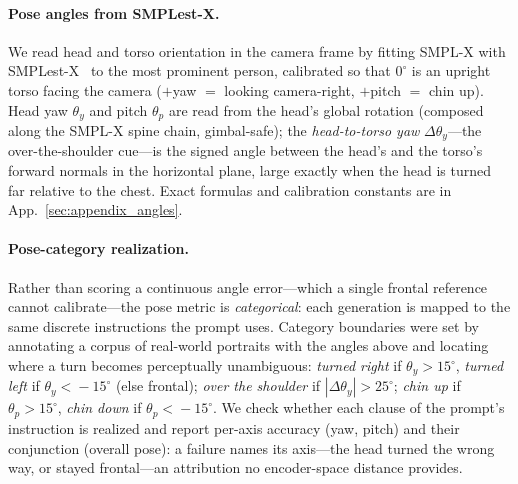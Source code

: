 \paragraph{Pose angles from SMPLest-X.}
We read head and torso orientation in the camera frame by fitting SMPL-X with
SMPLest-X~\cite{smplestx} to the most prominent person, calibrated so that
$0^\circ$ is an upright torso facing the camera ($+$yaw $=$ looking camera-right,
$+$pitch $=$ chin up). Head yaw $\theta_y$ and pitch $\theta_p$ are read from the
head's global rotation (composed along the SMPL-X spine chain, gimbal-safe);
the \emph{head-to-torso yaw} $\Delta\theta_y$---the over-the-shoulder cue---is
the signed angle between the head's and the torso's forward normals in the
horizontal plane, large exactly when the head is turned far relative to the
chest. Exact formulas and calibration constants are in
App.~\ref{sec:appendix_angles}.

\paragraph{Pose-category realization.} Rather than scoring a continuous angle
error---which a single frontal reference cannot calibrate---the pose metric is
\emph{categorical}: each generation is mapped to the same discrete
instructions the prompt uses. Category boundaries were set by annotating a
corpus of real-world portraits with the angles above and locating where a turn
becomes perceptually unambiguous: \emph{turned right} if
$\theta_y\!>\!15^\circ$, \emph{turned left} if $\theta_y\!<\!-15^\circ$ (else
frontal); \emph{over the shoulder} if $|\Delta\theta_y|\!>\!25^\circ$;
\emph{chin up} if $\theta_p\!>\!15^\circ$, \emph{chin down} if
$\theta_p\!<\!-15^\circ$. We check whether each clause of the prompt's
instruction is realized and report per-axis accuracy (yaw, pitch) and their
conjunction (overall pose): a failure names its axis---the head turned the
wrong way, or stayed frontal---an attribution no encoder-space distance
provides.

